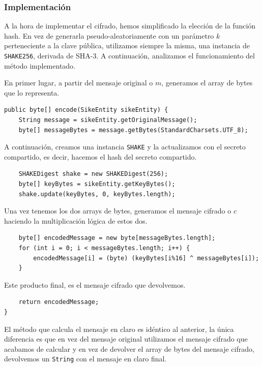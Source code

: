 \subsubsection{Implementación}

A la hora de implementar el cifrado, hemos simplificado la elección de la función hash. En vez de generarla pseudo-aleatoriamente con un parámetro $k$ perteneciente a la clave pública, utilizamos siempre la misma, una instancia de \verb|SHAKE256|, derivada de SHA-3. A continuación, analizamos el funcionamiento del método implementado.

En primer lugar, a partir del mensaje original o $m$, generamos el array de bytes que lo representa.

\begin{verbatim}
public byte[] encode(SikeEntity sikeEntity) {
    String message = sikeEntity.getOriginalMessage();
    byte[] messageBytes = message.getBytes(StandardCharsets.UTF_8);
\end{verbatim}

A continuación, creamos una instancia \verb|SHAKE| y la actualizamos con el secreto compartido, es decir, hacemos el hash del secreto compartido.

\begin{verbatim}
    SHAKEDigest shake = new SHAKEDigest(256);
    byte[] keyBytes = sikeEntity.getKeyBytes();
    shake.update(keyBytes, 0, keyBytes.length);
\end{verbatim}

Una vez tenemos los dos arrays de bytes, generamos el mensaje cifrado o $c$ haciendo la multiplicación lógica de estos dos.

\begin{verbatim}
    byte[] encodedMessage = new byte[messageBytes.length];
    for (int i = 0; i < messageBytes.length; i++) {
        encodedMessage[i] = (byte) (keyBytes[i%16] ^ messageBytes[i]);
    }
\end{verbatim}

Este producto final, es el mensaje cifrado que devolvemos.

\begin{verbatim}
    return encodedMessage;
}
\end{verbatim}

El método que calcula el mensaje en claro es idéntico al anterior, la única diferencia es que en vez del mensaje original utilizamos el mensaje cifrado que acabamos de calcular y en vez de devolver el array de bytes del mensaje cifrado, devolvemos un \verb|String| con el mensaje en claro final.

